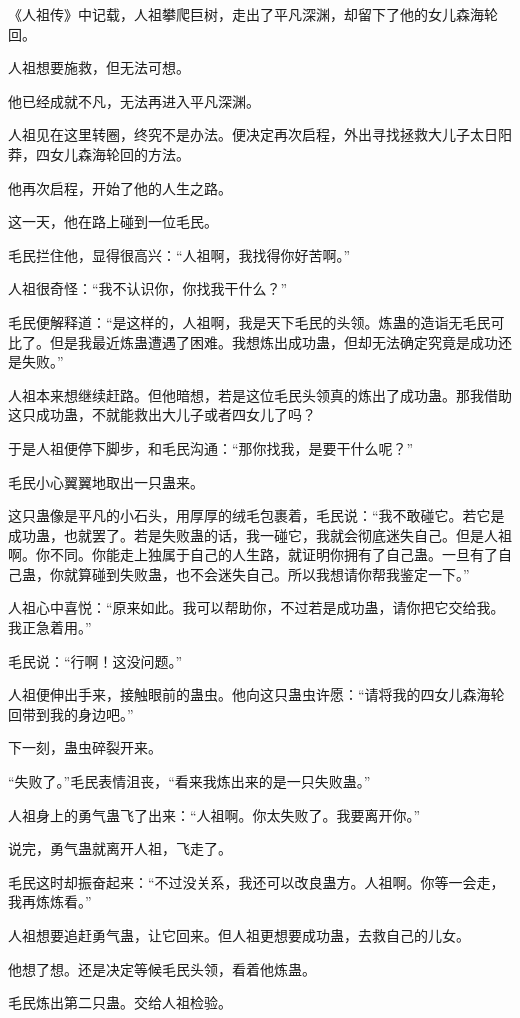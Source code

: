 \begin{this_body}
《人祖传》中记载，人祖攀爬巨树，走出了平凡深渊，却留下了他的女儿森海轮回。

人祖想要施救，但无法可想。

他已经成就不凡，无法再进入平凡深渊。

人祖见在这里转圈，终究不是办法。便决定再次启程，外出寻找拯救大儿子太日阳莽，四女儿森海轮回的方法。

他再次启程，开始了他的人生之路。

这一天，他在路上碰到一位毛民。

毛民拦住他，显得很高兴：“人祖啊，我找得你好苦啊。”

人祖很奇怪：“我不认识你，你找我干什么？”

毛民便解释道：“是这样的，人祖啊，我是天下毛民的头领。炼蛊的造诣无毛民可比了。但是我最近炼蛊遭遇了困难。我想炼出成功蛊，但却无法确定究竟是成功还是失败。”

人祖本来想继续赶路。但他暗想，若是这位毛民头领真的炼出了成功蛊。那我借助这只成功蛊，不就能救出大儿子或者四女儿了吗？

于是人祖便停下脚步，和毛民沟通：“那你找我，是要干什么呢？”

毛民小心翼翼地取出一只蛊来。

这只蛊像是平凡的小石头，用厚厚的绒毛包裹着，毛民说：“我不敢碰它。若它是成功蛊，也就罢了。若是失败蛊的话，我一碰它，我就会彻底迷失自己。但是人祖啊。你不同。你能走上独属于自己的人生路，就证明你拥有了自己蛊。一旦有了自己蛊，你就算碰到失败蛊，也不会迷失自己。所以我想请你帮我鉴定一下。”

人祖心中喜悦：“原来如此。我可以帮助你，不过若是成功蛊，请你把它交给我。我正急着用。”

毛民说：“行啊！这没问题。”

人祖便伸出手来，接触眼前的蛊虫。他向这只蛊虫许愿：“请将我的四女儿森海轮回带到我的身边吧。”

下一刻，蛊虫碎裂开来。

“失败了。”毛民表情沮丧，“看来我炼出来的是一只失败蛊。”

人祖身上的勇气蛊飞了出来：“人祖啊。你太失败了。我要离开你。”

说完，勇气蛊就离开人祖，飞走了。

毛民这时却振奋起来：“不过没关系，我还可以改良蛊方。人祖啊。你等一会走，我再炼炼看。”

人祖想要追赶勇气蛊，让它回来。但人祖更想要成功蛊，去救自己的儿女。

他想了想。还是决定等候毛民头领，看着他炼蛊。

毛民炼出第二只蛊。交给人祖检验。


\end{this_body}

